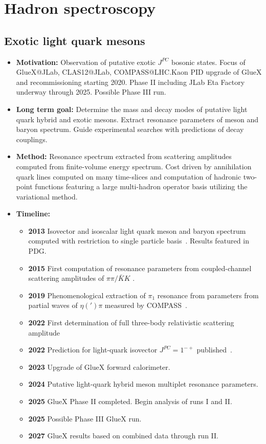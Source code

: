 \documentclass[12pt,hyperpdf]{article}
\begin{document}
\section{Hadron spectroscopy}\label{sec:hadspec}

\subsection{Exotic light quark mesons}
\begin{itemize}
    \item{\bf Motivation:} Observation of putative exotic $J^{PC}$ bosonic
      states. Focus of GlueX@JLab, CLAS12@JLab, COMPASS@LHC.Kaon PID
      upgrade of GlueX and recommissioning starting 2020. Phase II
      including JLab Eta Factory underway through 2025. Possible Phase
      III run.  
    \item{\bf Long term goal:} Determine the mass and decay modes of
      putative light quark hybrid and exotic mesons. Extract resonance
      parameters of meson and baryon spectrum. Guide experimental
      searches with predictions of decay couplings.
    \item{\bf Method:} Resonance spectrum extracted from scattering
      amplitudes computed from finite-volume energy spectrum. Cost
      driven by annihilation quark lines computed on many
      time-slices and computation of hadronic two-point functions
      featuring a large multi-hadron operator basis utilizing the variational method. 
\item{\bf Timeline:}
\begin{itemize}
    \item{\bf 2013} Isovector and isoscalar light quark meson and baryon
      spectrum computed with restriction to single particle basis~\cite{Dudek:2013yja}. Results featured in PDG.
    \item{\bf 2015} First computation of resonance parameters from coupled-channel scattering
      amplitudes of $\pi\pi/\bar{K}K$ \cite{Wilson:2015dqa}.
    \item{\bf 2019} Phenomenological extraction of $\pi_1$ resonance from 
      parameters from partial waves of $\eta(')\pi$ measured by COMPASS~\cite{JPAC:2018zyd}.
    \item{\bf 2022} First determination of full three-body relativistic scattering amplitude~\cite{Hansen:2020otl}
    \item{\bf 2022} Prediction for light-quark isovector $J^{PC}=1^{-+}$ published~\cite{Woss:2020ayi}.
    \item{\bf 2023} Upgrade of GlueX forward calorimeter.
    \item{\bf 2024} Putative light-quark hybrid meson multiplet resonance parameters.
    \item{\bf 2025} GlueX Phase II completed. Begin analysis of runs I and II. 
    \item{\bf 2025} Possible Phase III GlueX run.
    \item{\bf 2027} GlueX results based on combined data through run II.
\end{itemize}
\end{itemize}
\end{document}
